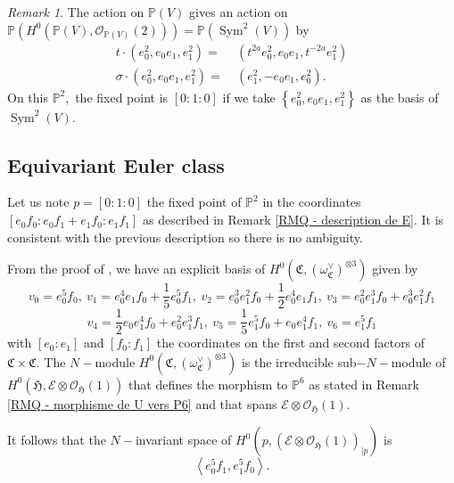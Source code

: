 \documentclass{amsart}
\theoremstyle{plain}%
\theoremstyle{remark}
\newtheorem{rmq}[subsubsection]{Remark}
\theoremstyle{definition}
\newcommand{\cE}{\mathcal{E}}
\newcommand{\cO}{\mathcal{O}}
\newcommand{\eP}{\mathbb{P}}
\newcommand{\fC}{\mathfrak{C}}
\newcommand{\fH}{\mathfrak{H}}
\newcommand{\qscal}[1]{\left\langle #1 \right\rangle}
\newcommand{\Symalg}[2][]{\operatorname{Sym}^{#1}\left(#2\right)}
\newcommand{\rest}[2]{{#1}_{\mid #2}}
\newcommand{\accol}[1]{\left\{#1\right\}}
\begin{document}
\begin{rmq}\label{RMQ - point fixe Sym2}
The action on $\eP(V)$ gives an action on $\eP(H^0(\eP(V),\cO_{\eP(V)}(2))) = \eP(\Symalg[2]{V})$ by
\begin{align*}
    t\cdot (e_0^2,e_0e_1,e_1^2) = &\ (t^{2a} e_0^2,e_0e_1, t^{-2a}e_1^2)\\
    \sigma\cdot (e_0^2,e_0e_1,e_1^2) = &\ (e_1^2,-e_0e_1,e_0^2).
\end{align*}
On this $\eP^2,$ the fixed point is $[0:1:0]$ if we take $\accol{e_0^2, e_0e_1,e_1^2}$ as the basis of $\Symalg[2]{V}$.
\end{rmq}









\subsection{Equivariant Euler class}\label{SSEC - classe euler equiv}




Let us note $p = [0:1:0]$ the fixed point of $\eP^2$ in the coordinates $[e_0f_0: e_0f_1 + e_1f_0 : e_1f_1]$ as described in Remark \ref{RMQ - description de E}. It is consistent with the previous description so there is no ambiguity.

From the proof of \cite[Proposition 2]{DFK25_fano22}, we have an explicit basis of $H^0(\fC,(\omega_\fC^\vee)^{\otimes 3})$ given by 
\[v_0 = e_0^5 f_0 ,\ v_1 = e^4_0 e_1 f_0 + \frac{1}{5} e^5_0 f_1 ,\ v_2 = e^3_0 e_1^2 f_0 + \frac{1}{2} e^4_0 e_1 f_1 ,\ v_3 = e^2_0 e_1^3 f_0 + e^3_0 e_1^2 f_1\]
\[v_4 = \frac{1}{2} e_0 e_1^4 f_0 + e^2_0 e_1^3 f_1 ,\ v_5 = \frac{1}{5} e_1^5 f_0 + e_0 e_1^4 f_1 ,\ v_6 = e_1^5 f_1\]
with $[e_0:e_1]$ and $[f_0:f_1]$ the coordinates on the first and second factors of $\fC\times \fC.$ The $N-$module $H^0(\fC,(\omega_\fC^\vee)^{\otimes 3})$ is the irreducible sub$-N-$module of $H^0(\fH,\cE\otimes\cO_\fH(1))$ that defines the morphism to $\eP^6$ as stated in Remark \ref{RMQ - morphisme de U vers P6} and that spans $\cE\otimes \cO_\fH(1)$.


It follows that the $N-$invariant space of $H^0(p,\rest{(\cE\otimes\cO_\fH(1))}{p})$ is
\[\qscal{e_0^5f_1, e_1^5f_0}.\]
\end{document}
